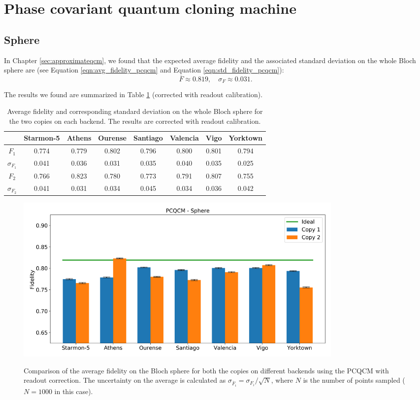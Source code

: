 \section{Phase covariant quantum cloning machine}
\subsection{Sphere}
In Chapter \ref{sec:approximateqcm}, we found that the expected average fidelity and the associated standard deviation on the whole Bloch sphere are (see Equation \ref{eqn:avg_fidelity_pcqcm} and Equation \ref{eqn:std_fidelity_pcqcm}):
\[
  \overline{F}\approx0.819, \quad \sigma_{F}\approx0.031.
\]

The results we found are summarized in Table \ref{tab:results_pcqcm_fullsphere_corrected} (corrected with readout calibration).
\begin{table}[H]
    \centering
    \begin{tabular}{|c|c|c|c|c|c|c|c|}
    \hline
    \textbf{} & \textbf{Starmon-5} & \textbf{Athens} & \textbf{Ourense} & \textbf{Santiago} & \textbf{Valencia} & \textbf{Vigo} & \textbf{Yorktown} \\ \hline
    $F_1$              & 0.774 & 0.779 & 0.802 & 0.796 & 0.800 & 0.801 & 0.794 \\ \hline
    $\sigma_{F_1}$     & 0.041 & 0.036 & 0.031 & 0.035 & 0.040 & 0.035 & 0.025 \\ \hline
    $F_2$              & 0.766 & 0.823 & 0.780 & 0.773 & 0.791 & 0.807 & 0.755 \\ \hline
    $\sigma_{F_2}$     & 0.041 & 0.031 & 0.034 & 0.045 & 0.034 & 0.036 & 0.042 \\ \hline
    \end{tabular}
    \caption{Average fidelity and corresponding standard deviation on the whole Bloch sphere for the two copies on each backend. The results are corrected with readout calibration.}
    \label{tab:results_pcqcm_fullsphere_corrected}
\end{table}
\begin{figure}[H]
  \centering
          \includegraphics[width=0.8\textwidth]{Figures/PhaseCovariant/Histograms/histo_sphere_corrected.png}
      \label{fig:pc_histo_sphere_corrected}
      \caption{Comparison of the average fidelity on the Bloch sphere for both the copies on different backends using the PCQCM with readout correction. The uncertainty on the average is calculated as $\sigma_{\overline{F}_i}=\sigma_{F_i}/\sqrt{N}$, where $N$ is the number of points sampled ($N=1000$ in this case).}
\end{figure}

